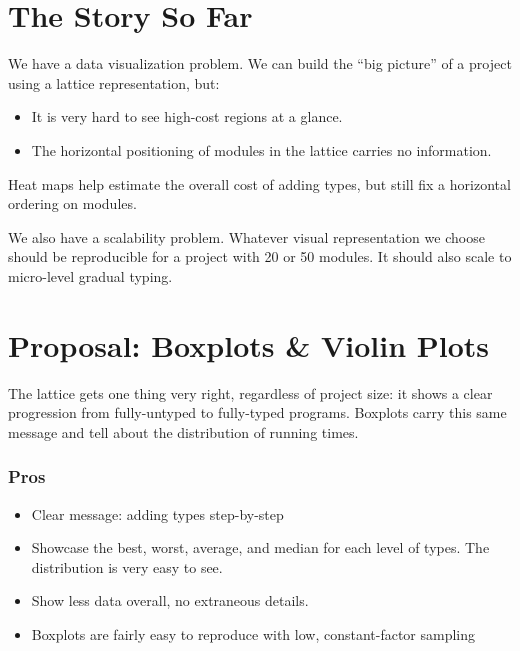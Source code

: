 \documentclass{article}
\begin{document}
\section{The Story So Far}
We have a data visualization problem.
We can build the ``big picture'' of a project using a lattice representation, but:
\begin{itemize}
\item
  It is very hard to see high-cost regions at a glance.
\item
  The horizontal positioning of modules in the lattice carries no information.
\end{itemize}

Heat maps help estimate the overall cost of adding types, but still fix a horizontal ordering on modules.

We also have a scalability problem.
Whatever visual representation we choose should be reproducible for a project with 20 or 50 modules.
It should also scale to micro-level gradual typing.


\section{Proposal: Boxplots \& Violin Plots}
The lattice gets one thing very right, regardless of project size: it shows a clear progression from fully-untyped to fully-typed programs.
Boxplots carry this same message and tell about the distribution of running times.

\subsubsection*{Pros}
\begin{itemize}
\item
  Clear message: adding types step-by-step
\item
  Showcase the best, worst, average, and median for each level of types.
  The distribution is very easy to see.
\item
  Show less data overall, no extraneous details.
\item
  Boxplots are fairly easy to reproduce with low, constant-factor sampling
\end{itemize}
\end{document}

